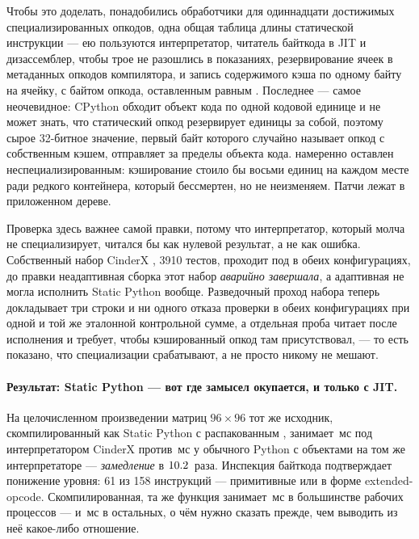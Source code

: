 Чтобы это доделать, понадобились обработчики для одиннадцати достижимых специализированных опкодов,
одна общая таблица длины статической инструкции --- ею пользуются интерпретатор, читатель байткода
в JIT и дизассемблер, чтобы трое не разошлись в показаниях, резервирование ячеек в метаданных
опкодов компилятора, и запись содержимого кэша по одному байту на ячейку, с байтом опкода,
оставленным равным . Последнее --- самое неочевидное: CPython обходит объект кода по
одной кодовой единице и не может знать, что статический опкод резервирует единицы за собой, поэтому
сырое 32-битное значение, первый байт которого случайно называет опкод с собственным кэшем,
отправляет  за пределы объекта кода.  намеренно
оставлен неспециализированным: кэширование  стоило бы восьми единиц на каждом
месте  ради редкого контейнера, который бессмертен, но не неизменяем. Патчи
лежат в приложенном дереве.

Проверка здесь важнее самой правки, потому что интерпретатор, который молча не специализирует,
читался бы как нулевой результат, а не как ошибка. Собственный набор CinderX
, 3910 тестов, проходит под  в обеих
конфигурациях, до правки неадаптивная сборка этот набор \emph{аварийно завершала}, а адаптивная не
могла исполнить Static Python вообще. Разведочный проход набора теперь докладывает три строки и ни
одного отказа проверки в обеих конфигурациях при одной и той же эталонной контрольной сумме, а
отдельная проба читает  после исполнения и требует, чтобы кэшированный
опкод там присутствовал, --- то есть показано, что специализации срабатывают, а не просто никому не
мешают.

\paragraph{Результат: Static Python --- вот где замысел окупается, и только с JIT.}
На целочисленном произведении матриц $96{\times}96$ тот же исходник, скомпилированный как Static
Python с распакованным , занимает \,мс под интерпретатором CinderX против
\,мс у обычного Python с объектами на том же интерпретаторе --- \emph{замедление} в
$\meas{ratio:b6_static-fork_static:matmul96_int/fork_static/static_interp|b6_static-fork_static:matmul96_int/fork_static/boxed_python}{10.2}$~раза. Инспекция байткода подтверждает понижение уровня: 61 из 158 инструкций ---
примитивные или в форме extended-opcode. Скомпилированная, та же функция занимает \,мс в
большинстве рабочих процессов --- и \,мс в остальных, о чём нужно сказать прежде, чем выводить
из неё какое-либо отношение.

